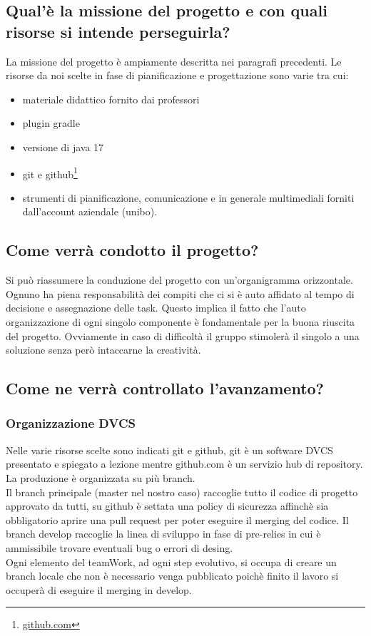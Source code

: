 \documentclass[a4paper,12pt]{report}
\begin{document}
\subsection{Qual'è la missione del progetto e con quali risorse si intende perseguirla?}
La missione del progetto è ampiamente descritta nei paragrafi precedenti.
Le risorse da noi scelte in fase di pianificazione e progettazione sono varie tra cui:
\begin{itemize}
    \item materiale didattico fornito dai professori
    \item plugin gradle
    \item versione di java 17
    \item git e github\footnote{\url{github.com}}
    \item strumenti di pianificazione, comunicazione e in generale multimediali forniti dall'account aziendale (unibo).
\end{itemize}

\subsection{Come verrà condotto il progetto?}
Si può riassumere la conduzione del progetto con un'organigramma orizzontale.
Ognuno ha piena responsabilità dei compiti che ci si è auto affidato al tempo di decisione e assegnazione delle task.
Questo implica il fatto che l'auto organizzazione di ogni singolo componente è fondamentale per la buona riuscita del progetto.
Ovviamente in caso di difficoltà il gruppo stimolerà il singolo a una soluzione senza però intaccarne la creatività.
\subsection{Come ne verrà controllato l'avanzamento?}
\subsubsection{Organizzazione DVCS}
Nelle varie risorse scelte sono indicati git e github, git è un software DVCS presentato e spiegato a lezione mentre github.com è un servizio
hub di repository.
La produzione è organizzata su più branch.
\\Il branch principale (master nel nostro caso) raccoglie tutto il codice di progetto approvato da tutti, su github è settata una policy
di sicurezza affinchè sia obbligatorio aprire una pull request per poter eseguire il merging del codice.
Il branch develop raccoglie la linea di sviluppo in fase di pre-relies in cui è ammissibile trovare eventuali bug o errori di desing.
\\Ogni elemento del teamWork, ad ogni step evolutivo, si occupa di creare un branch locale che non è necessario venga pubblicato poichè finito
il lavoro si occuperà di eseguire il merging  in develop.
\end{document}
